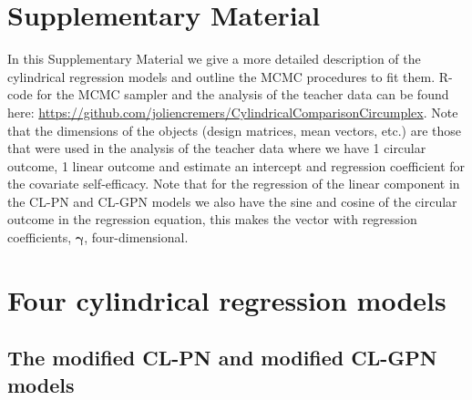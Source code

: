 \documentclass[12pt,]{article}
\title{}
\author{}
\date{}
\begin{document}
\section{Supplementary Material}\label{Appendix}

In this Supplementary Material we give a more detailed description of
the cylindrical regression models and outline the MCMC procedures to fit
them. R-code for the MCMC sampler and the analysis of the teacher data
can be found here:
\url{https://github.com/joliencremers/CylindricalComparisonCircumplex}.
Note that the dimensions of the objects (design matrices, mean vectors,
etc.) are those that were used in the analysis of the teacher data where
we have 1 circular outcome, 1 linear outcome and estimate an intercept
and regression coefficient for the covariate self-efficacy. Note that
for the regression of the linear component in the CL-PN and CL-GPN
models we also have the sine and cosine of the circular outcome in the
regression equation, this makes the vector with regression coefficients,
\(\boldsymbol{\gamma}\), four-dimensional.

\section{Four cylindrical regression models}\label{Models}

\subsection{The modified CL-PN and modified CL-GPN  models}\label{CL-(G)PN}
\end{document}
